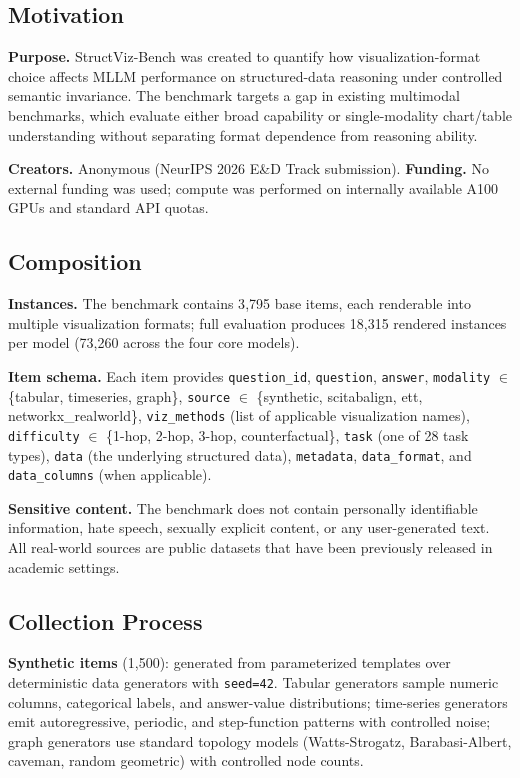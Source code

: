 \documentclass{article}
\begin{document}
\subsection{Motivation}
\textbf{Purpose.} StructViz-Bench was created to quantify how visualization-format choice affects MLLM performance on structured-data reasoning under controlled semantic invariance. The benchmark targets a gap in existing multimodal benchmarks, which evaluate either broad capability or single-modality chart/table understanding without separating format dependence from reasoning ability.

\textbf{Creators.} Anonymous (NeurIPS 2026 E\&D Track submission). \textbf{Funding.} No external funding was used; compute was performed on internally available A100 GPUs and standard API quotas.

\subsection{Composition}
\textbf{Instances.} The benchmark contains 3{,}795 base items, each renderable into multiple visualization formats; full evaluation produces 18{,}315 rendered instances per model (73{,}260 across the four core models).

\textbf{Item schema.} Each item provides \texttt{question\_id}, \texttt{question}, \texttt{answer}, \texttt{modality} $\in$ \{tabular, timeseries, graph\}, \texttt{source} $\in$ \{synthetic, scitabalign, ett, networkx\_realworld\}, \texttt{viz\_methods} (list of applicable visualization names), \texttt{difficulty} $\in$ \{1-hop, 2-hop, 3-hop, counterfactual\}, \texttt{task} (one of 28 task types), \texttt{data} (the underlying structured data), \texttt{metadata}, \texttt{data\_format}, and \texttt{data\_columns} (when applicable).

\textbf{Sensitive content.} The benchmark does not contain personally identifiable information, hate speech, sexually explicit content, or any user-generated text. All real-world sources are public datasets that have been previously released in academic settings.

\subsection{Collection Process}
\textbf{Synthetic items} (1{,}500): generated from parameterized templates over deterministic data generators with \texttt{seed=42}. Tabular generators sample numeric columns, categorical labels, and answer-value distributions; time-series generators emit autoregressive, periodic, and step-function patterns with controlled noise; graph generators use standard topology models (Watts-Strogatz, Barabasi-Albert, caveman, random geometric) with controlled node counts.
\end{document}

